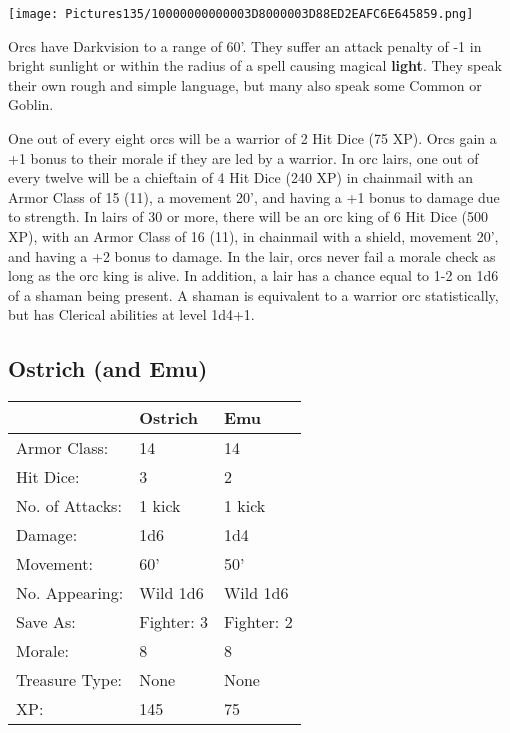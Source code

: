 \documentclass[a4paper,twoside,openany,10pt]{book}
\begin{document}
\begin{multicols}{2}
\begin{center} \texttt{[image: Pictures135/10000000000003D8000003D88ED2EAFC6E645859.png]} \end{center}


Orcs have Darkvision to a range of 60'. They suffer an attack penalty of -1 in bright sunlight or within the radius of a spell causing magical \textbf{light}. They speak their own rough and simple language, but many also speak some Common or Goblin.

One out of every eight orcs will be a warrior of 2 Hit Dice (75 XP). Orcs gain a +1 bonus to their morale if they are led by a warrior. In orc lairs, one out of every twelve will be a chieftain of 4 Hit Dice (240 XP) in chainmail with an Armor Class of 15 (11), a movement 20', and having a +1 bonus to damage due to strength. In lairs of 30 or more, there will be an orc king of 6 Hit Dice (500 XP), with an Armor Class of 16 (11), in chainmail with a shield, movement 20', and having a +2 bonus to damage. In the lair, orcs never fail a morale check as long as the orc king is alive. In addition, a lair has a chance equal to 1-2 on 1d6 of a shaman being present. A shaman is equivalent to a warrior orc statistically, but has Clerical abilities at level 1d4+1.


\subsection*{Ostrich (and Emu)}\label{ostrich-and-emu}

\begin{tabularx}{0.50\textwidth}{@{}llX@{}}
& Ostrich & Emu \\\hline
Armor Class: & 14 & 14 \\\hline
Hit Dice: & 3 & 2 \\\hline
No. of Attacks: & 1 kick & 1 kick \\\hline
Damage: & 1d6 & 1d4 \\\hline
Movement: & 60' & 50' \\\hline
No. Appearing: & Wild 1d6 & Wild 1d6 \\\hline
Save As: & Fighter: 3 & Fighter: 2 \\\hline
Morale: & 8 & 8 \\\hline
Treasure Type: & None & None \\\hline
XP: & 145 & 75 \\\hline
\end{tabularx}\medskip


\end{multicols}
\end{document}
